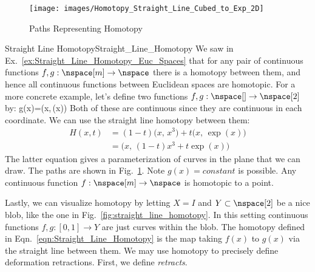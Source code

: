 \documentclass{book}                                                           %
\begin{document}
                \begin{figure}
                    \centering
                    \captionsetup{type=figure}
                    \texttt{[image: images/Homotopy\_Straight\_Line\_Cubed\_to\_Exp\_2D]}
                    \caption{Paths Representing Homotopy}
                    \label{fig:Paths_Representing_Homotopy}
                \end{figure}
                \begin{lexample}{Straight Line Homotopy}{Straight_Line_Homotopy}
                    We saw in Ex.~\ref{ex:Straight_Line_Homotopy_Euc_Spaces}
                    that for any pair of continuous functions
                    $f,g:\nspace[m]\rightarrow\nspace$ there is a homotopy
                    between them, and hence all continuous functions between
                    Euclidean spaces are homotopic. For a more concrete example,
                    let's define two functions
                    $f,g:\nspace[]\rightarrow\nspace[2]$ by:
                                {g(x)=\big(x,\,\exp(x)\big)}
                    Both of these are continuous since they are continuous in
                    each coordinate. We can use the straight line homotopy
                    between them:
                    \begin{subequations}
                        \begin{align}
                            H(x,t)
                            &=(1-t)\big(x,\,x^{3}\big)+t\big(x,\,\exp(x)\big)\\
                            &=\big(x,\,(1-t)x^{3}+t\exp(x)\big)
                        \end{align}
                    \end{subequations}
                    The latter equation gives a parameterization of curves in
                    the plane that we can draw. The paths are shown in
                    Fig.~\ref{fig:Paths_Representing_Homotopy}. Note
                    $g(x)=constant$ is possible. Any continuous function
                    $f:\nspace[m]\rightarrow\nspace$ is homotopic to a point.
                \end{lexample}
                \begin{minipage}{0.56\textwidth}
                    Lastly, we can visualize homotopy by letting $X=I$ and
                    $Y\subset\nspace[2]$ be a nice blob, like the one in
                    Fig.~\ref{fig:straight_line_homotopy}. In this setting
                    continuous functions $f,g:[0,1]\rightarrow{Y}$ are just
                    curves within the blob. The homotopy defined in
                    Eqn.~\ref{eqn:Straight_Line_Homotopy} is the map taking
                    $f(x)$ to $g(x)$ via the straight line between them. We may
                    use homotopy to precisely define deformation retractions.
                    First, we define \textit{retracts}.
                \end{minipage}
\end{document}
